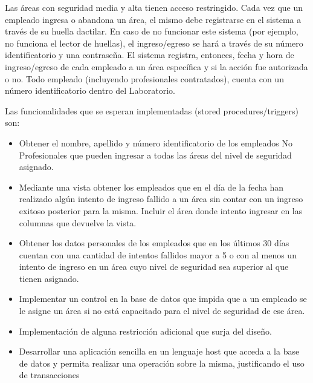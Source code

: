 Las áreas con seguridad media y alta tienen acceso restringido. Cada vez que un empleado ingresa
o abandona un área, el mismo debe registrarse en el sistema a través de su huella dactilar. En caso
de no funcionar este sistema (por ejemplo, no funciona el lector de huellas), el ingreso/egreso se
hará a través de su número identificatorio y una contraseña. El sistema registra, entonces, fecha y
hora de ingreso/egreso de cada empleado a un área específica y si la acción fue autorizada o no.
Todo empleado (incluyendo profesionales contratados), cuenta con un número identificatorio
dentro del Laboratorio.

Las funcionalidades que se esperan implementadas (stored procedures/triggers) son:

\begin{itemize}
    \item Obtener el nombre, apellido y número identificatorio de los empleados No Profesionales
que pueden ingresar a todas las áreas del nivel de seguridad asignado.
    \item Mediante una vista obtener los empleados que en el día de la fecha han realizado algún
intento de ingreso fallido a un área sin contar con un ingreso exitoso posterior para la
misma. Incluir el área donde intento ingresar en las columnas que devuelve la vista.
    \item Obtener los datos personales de los empleados que en los últimos 30 días cuentan con una
cantidad de intentos fallidos mayor a 5 o con al menos un intento de ingreso en un área
cuyo nivel de seguridad sea superior al que tienen asignado.
    \item Implementar un control en la base de datos que impida que a un empleado se le asigne un
área si no está capacitado para el nivel de seguridad de ese área.
    \item Implementación de alguna restricción adicional que surja del diseño.
    \item Desarrollar una aplicación sencilla en un lenguaje host que acceda a la base de datos y
permita realizar una operación sobre la misma, justificando el uso de transacciones
\end{itemize}
